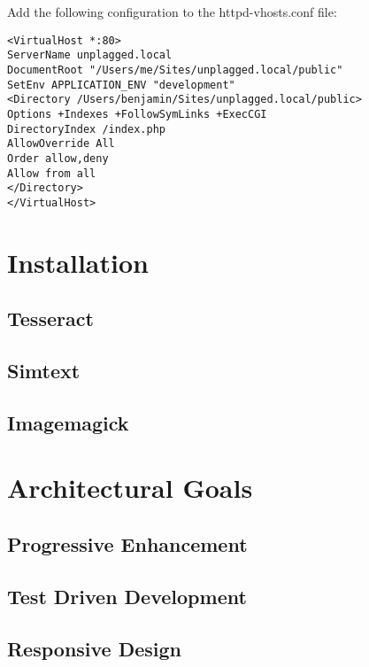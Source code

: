 Add the following configuration to the httpd-vhosts.conf file:

\begin{lstlisting}[caption=Apache configuration]
<VirtualHost *:80>
ServerName unplagged.local
DocumentRoot "/Users/me/Sites/unplagged.local/public" 
SetEnv APPLICATION_ENV "development" 
<Directory /Users/benjamin/Sites/unplagged.local/public>
Options +Indexes +FollowSymLinks +ExecCGI
DirectoryIndex /index.php
AllowOverride All
Order allow,deny
Allow from all
</Directory>
</VirtualHost>
\end{lstlisting}

\section{Installation}
\subsection{Tesseract}
\subsection{Simtext}
\subsection{Imagemagick}



\section{Architectural Goals}

\subsection{Progressive Enhancement}

\subsection{Test Driven Development}

\subsection{Responsive Design}